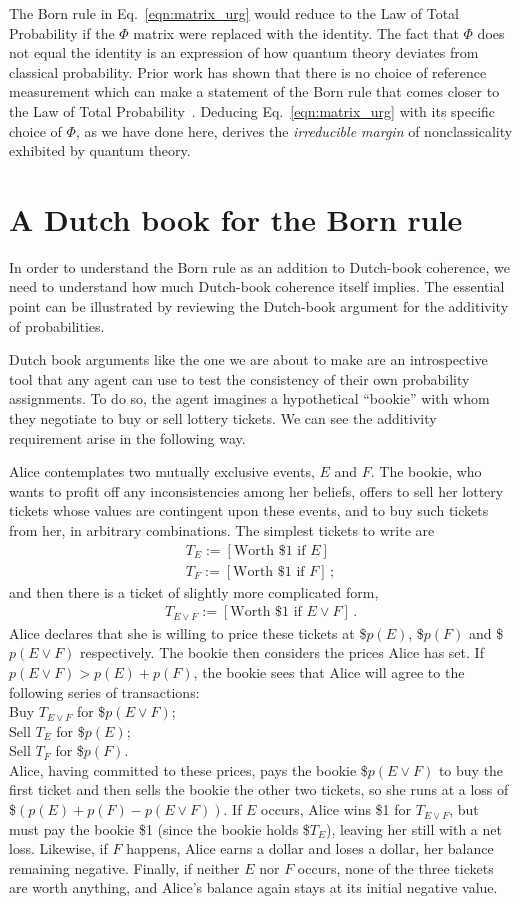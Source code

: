 \documentclass[%
 reprint,superscriptaddress,
 amsmath,amssymb,
 aps,pra, onecolumn, 12pt
]{revtex4-2}
\newcommand{\eqn}[1]{\begin{eqnarray} #1 \end{eqnarray}}
\newcommand{\tit}[1]{\textit{#1}}
\newcommand{\trm}[1]{\textrm{#1}}
\begin{document}
The Born rule in Eq.\ \eqref{eqn:matrix_urg} would reduce to the Law of Total Probability if the $\Phi$ matrix were replaced with the identity. The fact that $\Phi$ does not equal the identity is an expression of how quantum theory deviates from classical probability. Prior work has shown that there is no choice of reference measurement which can make a statement of the Born rule that comes closer to the Law of Total Probability~\cite{DeBrota20b}. Deducing Eq.\ \eqref{eqn:matrix_urg} with its specific choice of $\Phi$, as we have done here, derives the \tit{irreducible margin} of nonclassicality exhibited by quantum theory.

\section{A Dutch book for the Born rule \label{sec:dutch}}

In order to understand the Born rule as an addition to Dutch-book coherence, we need to understand how much Dutch-book coherence itself implies. The essential point can be illustrated by reviewing the Dutch-book argument for the additivity of probabilities.

Dutch book arguments like the one we are about to make are an introspective tool that any agent can use to test the consistency of their own probability assignments. To do so, the agent imagines a hypothetical ``bookie'' with whom they negotiate to buy or sell lottery tickets. We can see the additivity requirement arise in the following way.

Alice contemplates two mutually exclusive events, $E$ and $F$. The bookie, who wants to profit off any inconsistencies among her beliefs, offers to sell her lottery tickets whose values are contingent upon these events, and to buy such tickets from her, in arbitrary combinations. The simplest tickets to write are
\eqn{
  T_E := [ \trm{Worth \$1 if $E$} ] \, \nonumber \\
  T_F := [ \trm{Worth \$1 if $F$} ] \, ;
}
and then there is a ticket of slightly more complicated form,
\eqn{
  T_{E \lor F} := [ \trm{Worth \$1 if $E \lor F$} ] \, .
}
Alice declares that she is willing to price these tickets at \$$p(E)$, \$$p(F)$ and \$$p(E \lor F)$ respectively. The bookie then considers the prices Alice has set. If $p(E \lor F) > p(E) + p(F)$, the bookie sees that Alice will agree to the following series of transactions:\\
Buy $T_{E \lor F}$ for \$$p(E \lor F)$;\\
Sell $T_E$ for \$$p(E)$;\\
Sell $T_F$ for \$$p(F)$.\\
Alice, having committed to these prices, pays the bookie \$$p(E \lor F)$ to buy the first ticket and then sells the bookie the other two tickets, so she runs at a loss of \$$(p(E) + p(F) - p(E \lor F))$. If $E$ occurs, Alice wins \$1 for $T_{E \lor F}$, but must pay the bookie \$1 (since the bookie holds \$$T_E$), leaving her still with a net loss. Likewise, if $F$ happens, Alice earns a dollar and loses a dollar, her balance remaining negative. Finally, if neither $E$ nor $F$ occurs, none of the three tickets are worth anything, and Alice's balance again stays at its initial negative value.
\end{document}
